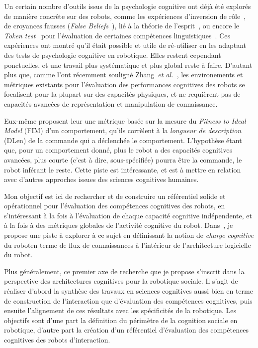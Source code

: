 \documentclass[a4paper]{article}
\newcommand{\etal}{{\textit{et al.~}}}
\begin{document}
Un certain nombre d'outils issus de la psychologie cognitive ont déjà été
explorés de manière concrête sur des robots, comme les expériences d'inversion
de rôle~\cite{Lallee2010b}, de croyances fausses (\emph{False
Beliefs}~\cite{Leslie2000}), lié à la théorie de l'esprit~\cite{Breazeal2006,
Warnier2012a, trafton2013act}, ou encore le \emph{Token
test}~\cite{DiSimoni1978} pour l'évaluation de certaines compétences
linguistiques~\cite{Mavridis2006}. Ces expériences ont montré qu'il était
possible et utile de ré-utiliser en les adaptant des tests de psychologie
cognitive en robotique. Elles restent cependant ponctuelles, et une travail plus
systématique et plus global reste à faire. D'autant plus que, comme l'ont
récemment souligné Zhang~\etal\cite{zhang2013evaluation}, les environements et
métriques existants pour l'évaluation des performances cognitives des robots se
focalisent pour la plupart sur des capacités physiques, et ne requièrent pas de
capacités avancées de représentation et manipulation de connaissance.

Eux-même proposent leur une métrique basée sur la mesure du \emph{Fitness to
Ideal Model} (FIM) d'un comportement, qu'ils corrèlent à la \emph{longueur de
description} (DLen) de la commande qui a déclenchée le comportement. L'hypothèse
étant que, pour un comportement donné, plus le robot a des capacités cognitives
avancées, plus courte (c'est à dire, sous-spécifiée) pourra être la commande, le
robot inférant le reste. Cette piste est intéressante, et est à mettre en
relation avec d'autres approches issues des sciences cognitives humaines.

Mon objectif est ici de rechercher et de construire un référentiel solide et
opérationnel pour l'évaluation des compétences cognitives des robots, en
s'intéressant à la fois à l'évaluation de chaque capacité cognitive
indépendente, et à la fois à des métriques globales de l'activité cognitive du
robot. Dans~\cite{lemaignan2013explicit}, je propose une piste à explorer à ce
sujet en définissant la notion de \emph{charge cognitive} du roboten terme de
flux de connaissances à l'intérieur de l'architecture logicielle du robot.

Plus généralement, ce premier axe de recherche que je propose s'inscrit dans la
perspective des architectures cognitives pour la robotique sociale. Il s'agit de
réaliser d'abord la synthèse des travaux en sciences cognitives aussi bien en
terme de construction de l'interaction que d'évaluation des compétences
cognitives, puis ensuite l'alignement de ces résultats avec les spécificités de
la robotique. Les objectifs sont d'une part la définition du périmètre de la
cognition sociale en robotique, d'autre part la création d'un référentiel
d'évaluation des compétences cognitives des robots d'interaction.
\end{document}
